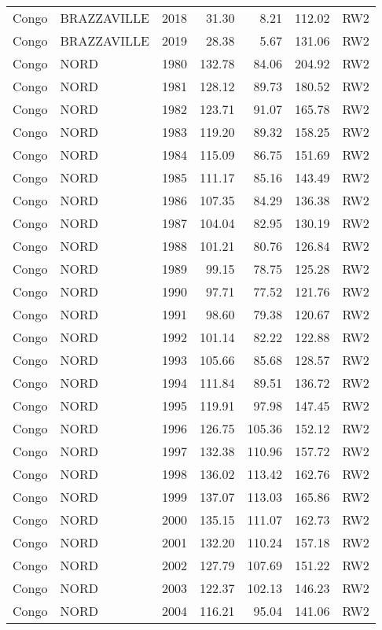 \begin{longtable}{lllrrrl}
  Congo & BRAZZAVILLE & 2018 & 31.30 & 8.21 & 112.02 & RW2 \\ 
  Congo & BRAZZAVILLE & 2019 & 28.38 & 5.67 & 131.06 & RW2 \\ 
  Congo & NORD & 1980 & 132.78 & 84.06 & 204.92 & RW2 \\ 
  Congo & NORD & 1981 & 128.12 & 89.73 & 180.52 & RW2 \\ 
  Congo & NORD & 1982 & 123.71 & 91.07 & 165.78 & RW2 \\ 
  Congo & NORD & 1983 & 119.20 & 89.32 & 158.25 & RW2 \\ 
  Congo & NORD & 1984 & 115.09 & 86.75 & 151.69 & RW2 \\ 
  Congo & NORD & 1985 & 111.17 & 85.16 & 143.49 & RW2 \\ 
  Congo & NORD & 1986 & 107.35 & 84.29 & 136.38 & RW2 \\ 
  Congo & NORD & 1987 & 104.04 & 82.95 & 130.19 & RW2 \\ 
  Congo & NORD & 1988 & 101.21 & 80.76 & 126.84 & RW2 \\ 
  Congo & NORD & 1989 & 99.15 & 78.75 & 125.28 & RW2 \\ 
  Congo & NORD & 1990 & 97.71 & 77.52 & 121.76 & RW2 \\ 
  Congo & NORD & 1991 & 98.60 & 79.38 & 120.67 & RW2 \\ 
  Congo & NORD & 1992 & 101.14 & 82.22 & 122.88 & RW2 \\ 
  Congo & NORD & 1993 & 105.66 & 85.68 & 128.57 & RW2 \\ 
  Congo & NORD & 1994 & 111.84 & 89.51 & 136.72 & RW2 \\ 
  Congo & NORD & 1995 & 119.91 & 97.98 & 147.45 & RW2 \\ 
  Congo & NORD & 1996 & 126.75 & 105.36 & 152.12 & RW2 \\ 
  Congo & NORD & 1997 & 132.38 & 110.96 & 157.72 & RW2 \\ 
  Congo & NORD & 1998 & 136.02 & 113.42 & 162.76 & RW2 \\ 
  Congo & NORD & 1999 & 137.07 & 113.03 & 165.86 & RW2 \\ 
  Congo & NORD & 2000 & 135.15 & 111.07 & 162.73 & RW2 \\ 
  Congo & NORD & 2001 & 132.20 & 110.24 & 157.18 & RW2 \\ 
  Congo & NORD & 2002 & 127.79 & 107.69 & 151.22 & RW2 \\ 
  Congo & NORD & 2003 & 122.37 & 102.13 & 146.23 & RW2 \\ 
  Congo & NORD & 2004 & 116.21 & 95.04 & 141.06 & RW2 \\ 

\end{longtable}
